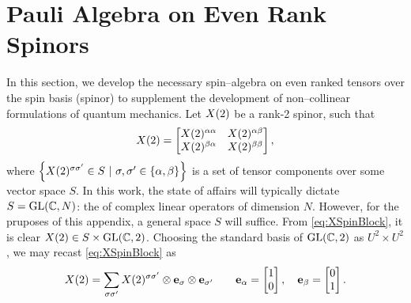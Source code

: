 \chapter{Pauli Algebra on Even Rank Spinors}
\label{apx:SpinorOp}

In this section, we develop the necessary spin--algebra on even ranked tensors over the spin basis (spinor) to supplement the development 
of non--collinear formulations of quantum mechanics.
Let $\spinor{2}{X}$ be a rank-2 spinor, such that
\begin{equation}
\label{eq:XSpinBlock}
\spinor{2}{X} = 
  \begin{bmatrix}
    \spinor{2}{X}^{\alpha\alpha} & \spinor{2}{X}^{\alpha\beta} \\
    \spinor{2}{X}^{\beta\alpha}  & \spinor{2}{X}^{\beta\beta} \\
  \end{bmatrix}, 
\end{equation}
where $\left\lbrace\spinor{2}{X}^{\sigma\sigma'} \in S
\text{ }\vert\text{ } \sigma,\sigma' \in \{\alpha,\beta\} \right\rbrace$ is a
set of tensor components over some vector space $S$. In this work, the state of affairs will
typically dictate $S = \GL{C}{N}$: the  of complex linear operators of dimension $N$. However, 
for the pruposes of this appendix, a general space $S$ will suffice. From \cref{eq:XSpinBlock}, 
it is clear $\spinor{2}{X} \in S \times \GL{C}{2}$.
Choosing the standard basis of $\GL{C}{2}$ as $U^2 \times U^2$,
we may recast \cref{eq:XSpinBlock} as
\begin{equation}
\label{eq:XSpinComp}
  \spinor{2}{X} = \sum_{\sigma\sigma'} \spinor{2}{X}^{\sigma\sigma'} \otimes \mathbf{e}_\sigma \otimes \mathbf{e}_{\sigma'} 
  \qquad 
  \mathbf{e}_\alpha = \begin{bmatrix} 1 \\ 0 \end{bmatrix}, \quad 
  \mathbf{e}_\beta  = \begin{bmatrix} 0 \\ 1 \end{bmatrix}.
\end{equation}

